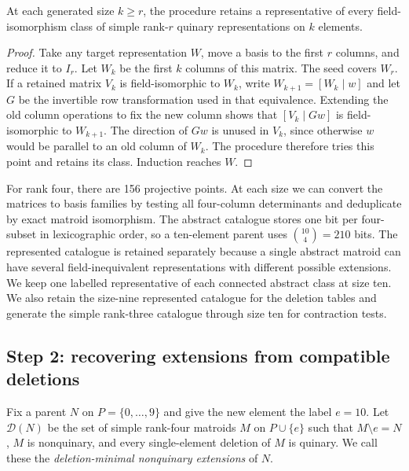 \documentclass[11pt,letterpaper,titlepage]{article}
\begin{document}
\begin{proposition}
\label{prop:method-generation}
At each generated size \(k\geq r\), the procedure retains a representative of every field-isomorphism class of simple rank-\(r\) quinary representations on \(k\) elements.
\end{proposition}
\begin{proof}
Take any target representation \(W\), move a basis to the first \(r\) columns, and reduce it to \(I_r\). Let \(W_k\) be the first \(k\) columns of this matrix. The seed covers \(W_r\). If a retained matrix \(V_k\) is field-isomorphic to \(W_k\), write \(W_{k+1}=[W_k\mid w]\) and let \(G\) be the invertible row transformation used in that equivalence. Extending the old column operations to fix the new column shows that \([V_k\mid Gw]\) is field-isomorphic to \(W_{k+1}\). The direction of \(Gw\) is unused in \(V_k\), since otherwise \(w\) would be parallel to an old column of \(W_k\). The procedure therefore tries this point and retains its class. Induction reaches \(W\).
\end{proof}

For rank four, there are 156 projective points. At each size we can convert the matrices to basis families by testing all four-column determinants and deduplicate by exact matroid isomorphism. The abstract catalogue stores one bit per four-subset in lexicographic order, so a ten-element parent uses \(\binom{10}{4}=210\) bits. The represented catalogue is retained separately because a single abstract matroid can have several field-inequivalent representations with different possible extensions. We keep one labelled representative of each connected abstract class at size ten. We also retain the size-nine represented catalogue for the deletion tables and generate the simple rank-three catalogue through size ten for contraction tests.

\subsection{Step 2: recovering extensions from compatible deletions}

Fix a parent \(N\) on \(P=\{0,\ldots,9\}\) and give the new element the label \(e=10\). Let \(\mathcal{D}(N)\) be the set of simple rank-four matroids \(M\) on \(P\cup\{e\}\) such that \(M\setminus e=N\), \(M\) is nonquinary, and every single-element deletion of \(M\) is quinary. We call these the \emph{deletion-minimal nonquinary extensions} of \(N\).
\end{document}
